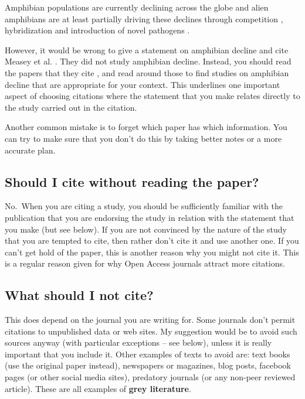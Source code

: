 \documentclass[
]{krantz}
\renewenvironment{quote}{\begin{VF}}{\end{VF}}
\begin{document}
\begin{quote}
Amphibian populations are currently declining across the globe \citep{wake2008are, collins2009extinction, pimm2014biodiversity} and alien amphibians are at least partially driving these declines through competition \citep{kupferberg1997bullfrog}, hybridization \citep{dufresnes2015introgressive} and introduction of novel pathogens \citep{berger1999chytrid, daszak2003infectious, lamarca2005catastrophic, martel2013batrachochytrium}.
\end{quote}

However, it would be wrong to give a statement on amphibian decline and cite Measey et al. \citeyearpar{measey2016global}. They did not study amphibian decline. Instead, you should read the papers that they cite \citep[e.g.][]{wake2008are, collins2009extinction, pimm2014biodiversity}, and read around those to find studies on amphibian decline that are appropriate for your context. This underlines one important aspect of choosing citations where the statement that you make relates directly to the study carried out in the citation.

Another common mistake is to forget which paper has which information. You can try to make sure that you don't do this by taking better notes or a more accurate plan.

\hypertarget{should-i-cite-without-reading-the-paper}{%
\subsection{Should I cite without reading the paper?}\label{should-i-cite-without-reading-the-paper}}

No.~When you are citing a study, you should be sufficiently familiar with the publication that you are endorsing the study in relation with the statement that you make (but see below). If you are not convinced by the nature of the study that you are tempted to cite, then rather don't cite it and use another one. If you can't get hold of the paper, this is another reason why you might not cite it. This is a regular reason given for why Open Access journals attract more citations.

\hypertarget{what-should-i-not-cite}{%
\subsection{What should I not cite?}\label{what-should-i-not-cite}}

This does depend on the journal you are writing for. Some journals don't permit citations to unpublished data or web sites. My suggestion would be to avoid such sources anyway (with particular exceptions -- see below), unless it is really important that you include it. Other examples of texts to avoid are: text books (use the original paper instead), newspapers or magazines, blog posts, facebook pages (or other social media sites), predatory journals (or any non-peer reviewed article). These are all examples of \textbf{grey literature}.
\end{document}
